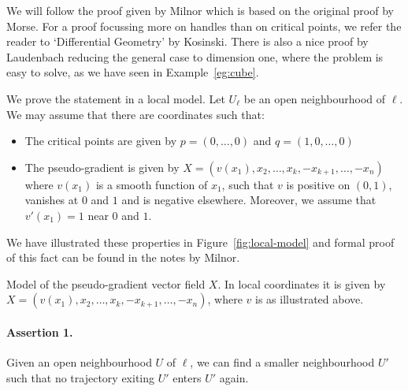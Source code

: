\begin{myproof}
    We will follow the proof given by Milnor which is based on the original proof by Morse.
    For a proof focussing more on handles than on critical points, we refer the reader to `Differential Geometry' by Kosinski.
    There is also a nice proof by Laudenbach reducing the general case to dimension one, where the problem is easy to solve, as we have seen in Example~\ref{eg:cube}.

We prove the statement in a local model.
Let $U_\ell$ be an open neighbourhood of $\ell$. 
We may assume that there are coordinates such that:
\begin{itemize}
    \item  The critical points are given by $p = (0, \ldots, 0)$ and $q = (1, 0, \ldots, 0)$
    \item The pseudo-gradient is given by $X = (v(x_1), x_2, \ldots, x_k, -x_{k+1}, \ldots, -x_n)$ where $v(x_1)$ is a smooth function of $x_1$, such that  $v$ is positive on  $(0, 1)$, vanishes at $0$ and $1$ and is negative elsewhere.
        Moreover, we assume that  $v'(x_1) = 1$ near $0$ and $1$.
\end{itemize}
We have illustrated these properties in Figure~\ref{fig:local-model} and formal proof of this fact can be found in the notes by Milnor.
\begin{marginfigure}
    \centering
    \caption{Model of the pseudo-gradient vector field $X$. In local coordinates it is given by $X = (v(x_1), x_2, \ldots, x_k, -x_{k+1}, \ldots, -x_n)$, where $v$ is as illustrated above.
    }
    \label{fig:local-model}
\end{marginfigure}

\renewcommand{\qedsymbol}{\ensuremath{\blacksquare}}

\paragraph{Assertion 1.}
Given an open neighbourhood $U$ of  $ \ell$, we can find a smaller neighbourhood $U'$ such that no trajectory exiting $U'$ enters $U'$ again.


\end{myproof}
